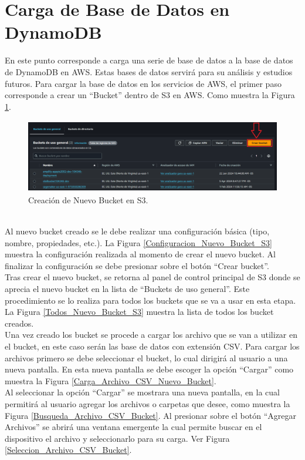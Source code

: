 \documentclass[a4paper,10pt, oneside, titlepage]{article}
\begin{document}
	\section{Carga de Base de Datos en DynamoDB}\label{Etiqueta_Carga_Base_DyanmoDB}
	En este punto corresponde a carga una serie de base de datos a la base de datos de DynamoDB en AWS. Estas bases de datos servirá para su análisis y estudios futuros. Para cargar la base de datos en los servicios de AWS, el primer paso corresponde a crear un ``Bucket'' dentro de S3 en AWS. Como muestra la Figura \ref{Creacion_Nuevo_Bucket_S3}.
	\begin{figure}[!h]
		\centering
		\includegraphics[width = 1\linewidth, height = 3.2cm]{Creacion_Nuevo_Bucket_S3.png}
		\caption{Creación de Nuevo Bucket en S3.}
		\label{Creacion_Nuevo_Bucket_S3}
	\end{figure} \\
	\indent Al nuevo bucket creado se le debe realizar una configuración básica (tipo, nombre, propiedades, etc.). La Figura \ref{Configuracion_Nuevo_Bucket_S3} muestra la configuración realizada al momento de crear el nuevo bucket. Al finalizar la configuración se debe presionar sobre el botón ``Crear bucket''. \\\newline
	\indent Tras crear el nuevo bucket, se retorna al panel de control principal de S3 donde se aprecia el nuevo bucket en la lista de ``Buckets de uso general''. Este procedimiento se lo realiza para todos los buckets que se va a usar en esta etapa. La Figura \ref{Todos_Nuevo_Bucket_S3} muestra la lista de todos los bucket creados. \\\newline
	\indent Una vez creado los bucket se procede a cargar los archivo que se van a utilizar en el bucket, en este caso serán las base de datos con extensión CSV. Para cargar los archivos primero se debe seleccionar el bucket, lo cual dirigirá al usuario a una nueva pantalla. En esta nueva pantalla se debe escoger la opción ``Cargar'' como muestra la Figura \ref{Carga_Archivo_CSV_Nuevo_Bucket}. \\\newline
	\indent Al seleccionar la opción ``Cargar'' se mostrara una nueva pantalla, en la cual permitirá al usuario agregar los archivos o carpetas que desee, como muestra la Figura \ref{Busqueda_Archivo_CSV_Bucket}. Al presionar sobre el botón ``Agregar Archivos'' se abrirá una ventana emergente la cual permite buscar en el dispositivo el archivo y seleccionarlo para su carga. Ver Figura \ref{Seleccion_Archivo_CSV_Bucket}. \\\newline
\end{document}
